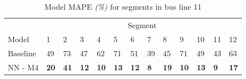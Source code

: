 \begin{table}[H]
	\centering
	\caption{Model MAPE \textit{(\%)} for segments in bus line 11}
	\label{fig:model-mape-of-segs-211}
	\begin{adjustbox}{center}
	\begin{tabular}{ l | l | l | l | l | l | l | l | l | l | l | l | l}
		& \multicolumn{12}{c}{Segment} \\
		Model       & 1 & 2 & 3 & 4 & 5 & 6 & 7 & 8 & 9 & 10 & 11 & 12 \\
		\hline
		Baseline  & 49 & 73 & 47 & 62 & 71 & 51 & 39 & 45 & 71 & 49  & 43 & 63 \\
		NN - M4         & \textbf{20}& \textbf{41}& \textbf{12}& \textbf{10}& \textbf{13}& \textbf{12}& \textbf{8}& \textbf{19}& \textbf{10}& \textbf{13}& \textbf{9}& \textbf{17}\\
	\end{tabular}
	\end{adjustbox}
\end{table}





